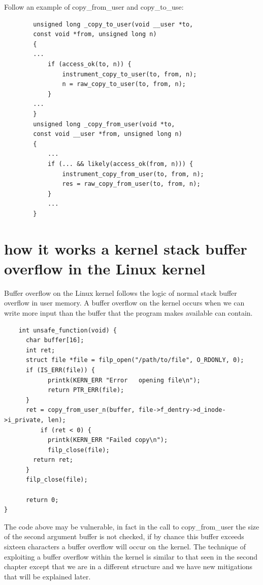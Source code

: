     Follow an example of copy\_from\_user and copy\_to\_use:\newline
    \begin{verbatim}
        unsigned long _copy_to_user(void __user *to, 
        const void *from, unsigned long n) 
        { 
        ... 
            if (access_ok(to, n)) { 
                instrument_copy_to_user(to, from, n); 
                n = raw_copy_to_user(to, from, n); 
            } 
        ... 
        } 
        unsigned long _copy_from_user(void *to, 
        const void __user *from, unsigned long n) 
        { 
            ... 
            if (... && likely(access_ok(from, n))) { 
                instrument_copy_from_user(to, from, n); 
                res = raw_copy_from_user(to, from, n); 
            } 
            ... 
        } 
    \end{verbatim}
    \section{how it works a kernel stack buffer overflow in the Linux kernel}
    Buffer overflow on the Linux kernel follows the logic of normal stack buffer overflow in user memory.
    A buffer overflow on the kernel occurs when we can write more input than the buffer that the program makes available can contain.\newline    
    \begin{verbatim}
    int unsafe_function(void) {
      char buffer[16];
      int ret;
      struct file *file = filp_open("/path/to/file", O_RDONLY, 0);
      if (IS_ERR(file)) {
            printk(KERN_ERR "Error   opening file\n");
            return PTR_ERR(file);
      }
      ret = copy_from_user_n(buffer, file->f_dentry->d_inode->i_private, len);
          if (ret < 0) {
            printk(KERN_ERR "Failed copy\n");
            filp_close(file);
        return ret;
      } 
      filp_close(file);
    
      return 0;
}    
    \end{verbatim}
    The code above may be vulnerable, in fact in the call to copy\_from\_user the size of the second argument buffer is not checked, if by chance this buffer exceeds sixteen characters a buffer overflow will occur on the kernel.\newline
    The technique of exploiting a buffer overflow within the kernel is similar to that seen in the second chapter except that we are in a different structure and we have new mitigations that will be explained later.\newline
    \clearpage
